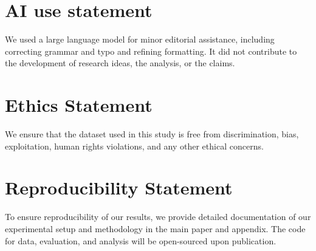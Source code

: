 \newpage
\section*{AI use statement}
We used a large language model for minor editorial assistance, including correcting grammar and typo and refining formatting. It did not contribute to the development of research ideas, the analysis, or the claims.

\section*{Ethics Statement}
We ensure that the dataset used in this study is free from discrimination, bias, exploitation, human rights violations, and any other ethical concerns.

\section*{Reproducibility Statement}
To ensure reproducibility of our results, we provide detailed documentation of our experimental setup and methodology in the main paper and appendix. The code for data, evaluation,
and analysis will be open-sourced upon publication.

